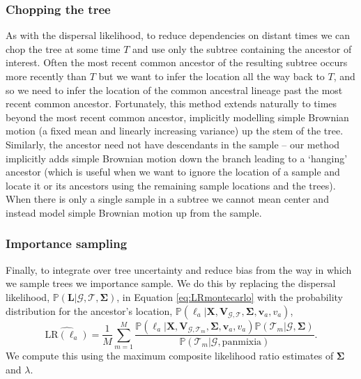 \documentclass[12pt]{article}
\begin{document}
\subsubsection*{Chopping the tree}

As with the dispersal likelihood, to reduce dependencies on distant times we can chop the tree at some time $T$ and use only the subtree containing the ancestor of interest. 
Often the most recent common ancestor of the resulting subtree occurs more recently than $T$ but we want to infer the location all the way back to $T$, and so we need to infer the location of the common ancestral lineage past the most recent common ancestor. 
Fortunately, this method extends naturally to times beyond the most recent common ancestor, implicitly modelling simple Brownian motion (a fixed mean and linearly increasing variance) up the stem of the tree.
Similarly, the ancestor need not have descendants in the sample -- our method implicitly adds simple Brownian motion down the branch leading to a `hanging' ancestor (which is useful when we want to ignore the location of a sample and locate it or its ancestors using the remaining sample locations and the trees).
When there is only a single sample in a subtree we cannot mean center and instead model simple Brownian motion up from the sample.

\subsubsection*{Importance sampling}

Finally, to integrate over tree uncertainty and reduce bias from the way in which we sample trees we importance sample.
We do this by replacing the dispersal likelihood, $\mathbb{P}(\mathbf{L} | \mathcal{G},\mathcal{T}, \mathbf{\Sigma})$, in Equation \eqref{eq:LRmontecarlo} with the probability distribution for the ancestor's location, $\mathbb{P}(\bm{\ell}_a | \mathbf{X}, \mathbf{V}_{\mathcal{G},\mathcal{T}}, \mathbf{\Sigma}, \mathbf{v}_a, v_a)$,
%
\begin{equation}\label{eq:LRmontecarloAncestors}
\widehat{\mathrm{LR}(\bm{\ell}_a)} = \frac{1}{M} \sum_{m=1}^{M} \frac{ \mathbb{P}(\bm{\ell}_a | \mathbf{X}, \mathbf{V}_{\mathcal{G},\mathcal{T}_m}, \mathbf{\Sigma}, \mathbf{v}_a, v_a) \mathbb{P}(\mathcal{T}_m | \mathcal{G}, \mathbf{\Sigma})}{\mathbb{P}(\mathcal{T}_m | \mathcal{G},\mathrm{panmixia})}.
\end{equation}
%
We compute this using the maximum composite likelihood ratio estimates of $\mathbf{\Sigma}$ and $\lambda$.
\end{document}
